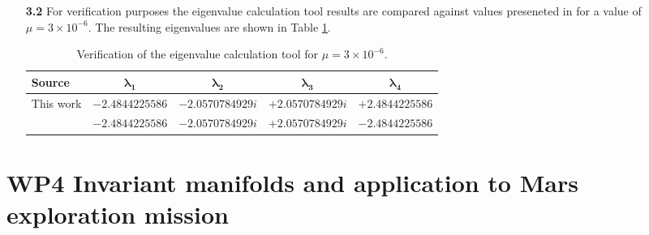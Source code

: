 \documentclass[a4paper,12pt]{article}
\begin{document}
\begin{enumerate}
    \item[\textbf{3.2}] For verification purposes the eigenvalue calculation tool results are compared against values preseneted in \cite{szebehely1967theory} for a 
    value of $\mu = 3\times 10^{-6}$. The resulting eigenvalues are shown in Table \ref{tab:eigenvalues_szebehely}.

    \vspace{1em}
    \begin{table}[htbp]
        \centering
        \caption{Verification of the eigenvalue calculation tool for $\mu = 3\times 10^{-6}$.}   
        \label{tab:eigenvalues_szebehely}
        \begin{tabular}{lcccc}
            \toprule
            \textbf{Source} & $\bm{\lambda_1}$ & $\bm{\lambda_2}$ & $\bm{\lambda_3}$ & $\bm{\lambda_4}$ \\
            \midrule
            This work & $-2.4844225586$ & $-2.0570784929i$ & $+2.0570784929i$ & $+2.4844225586$ \\
            \textcite{szebehely1967theory} & $-2.4844225586$ & $-2.0570784929i$ & $+2.0570784929i$ & $-2.4844225586$ \\
            \bottomrule
        \end{tabular}
    \end{table}

\end{enumerate}

\newpage
{}
\section*{WP4 Invariant manifolds and application to Mars exploration mission}
\label{sec:wp4}
\end{document}
